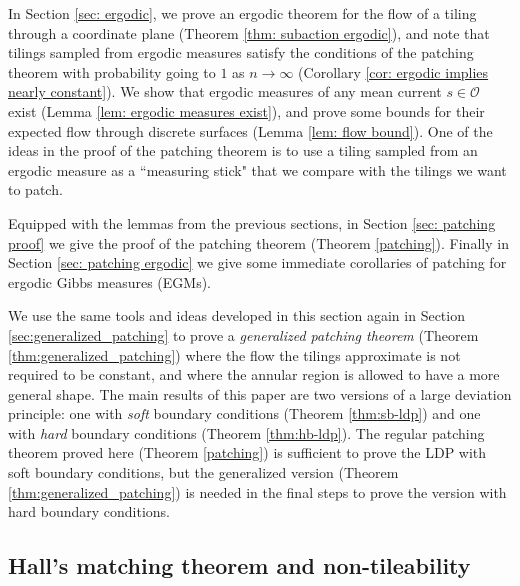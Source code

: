 \documentclass[11pt]{article}
\theoremstyle{remark}
\theoremstyle{definition}
\newcommand{\mc}[1]{\mathcal{#1}}
\begin{document}
In Section \ref{sec: ergodic}, we prove an ergodic theorem for the flow of a tiling through a coordinate plane (Theorem \ref{thm: subaction ergodic}), and note that tilings sampled from ergodic measures satisfy the conditions of the patching theorem with probability going to $1$ as $n\to \infty$ (Corollary \ref{cor: ergodic implies nearly constant}). We show that ergodic measures of any mean current $s\in \mc O$ exist (Lemma \ref{lem: ergodic measures exist}), and prove some bounds for their expected flow through discrete surfaces (Lemma \ref{lem: flow bound}). One of the ideas in the proof of the patching theorem is to use a tiling sampled from an ergodic measure as a ``measuring stick" that we compare with the tilings we want to patch. 

Equipped with the lemmas from the previous sections, in Section \ref{sec: patching proof} we give the proof of the patching theorem (Theorem \ref{patching}). Finally in Section \ref{sec: patching ergodic} we give some immediate corollaries of patching for ergodic Gibbs measures (EGMs). 

We use the same tools and ideas developed in this section again in Section \ref{sec:generalized_patching} to prove a \textit{generalized patching theorem} (Theorem \ref{thm:generalized_patching}) where the flow the tilings approximate is not required to be constant, and where the annular region is allowed to have a more general shape. The main results of this paper are two versions of a large deviation principle: one with \textit{soft} boundary conditions (Theorem \ref{thm:sb-ldp}) and one with \textit{hard} boundary conditions (Theorem \ref{thm:hb-ldp}). The regular patching theorem proved here (Theorem \ref{patching}) is sufficient to prove the LDP with soft boundary conditions, but the generalized version (Theorem \ref{thm:generalized_patching}) is needed in the final steps to prove the version with hard boundary conditions. 

\subsection{Hall's matching theorem and non-tileability}\label{sec: hall}
\end{document}
